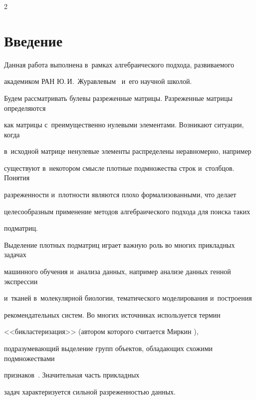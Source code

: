 \begin{multicols}{2}





\label{st\stat}





\section{Введение}





Данная работа выполнена в~рамках алгебраического подхода, развиваемого 


академиком РАН Ю.\,И.~Журавлевым~\cite{Jur1,Jur2,Jur3} и~его научной школой.


Будем рассматривать булевы разреженные матрицы. Разреженные матрицы определяются 


как мат\-ри\-цы с~преимущественно нулевыми элементами. Возникают ситуации, когда 


в~исходной матрице ненулевые элементы распределены неравномерно, например 


существуют в~некотором смысле плотные подмножества строк и~столбцов. Понятия 


разреженности и~плотности являются плохо формализованными, что делает 


целесообразным применение методов алгебраического подхода для поиска таких 


подматриц.





Выделение плотных подматриц играет важную роль во многих прикладных задачах 


машинного обучения и~анализа данных, например анализе данных генной экспрессии 


и~тканей в~молекулярной биологии, тематического моделирования и~построения 


рекомендательных систем. Во многих источниках используется термин 


<<бикластеризация>> (автором которого считается Миркин \cite{Mirkin}),  


подразумевающий выделение групп объектов, обладающих схожими подмножествами 


признаков~\cite{Hartigan, cheng_church,tanay}. Значительная часть прикладных 


задач характеризуется сильной разреженностью данных.






\end{multicols}
